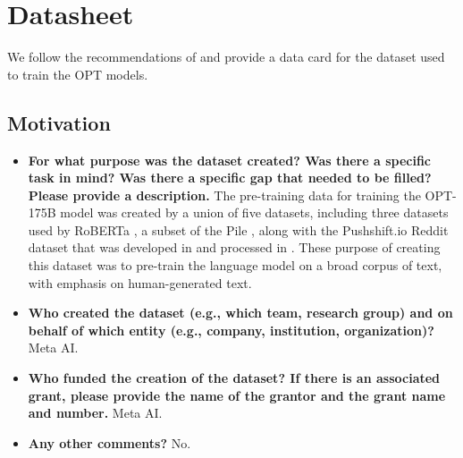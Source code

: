\documentclass[11pt]{article}
\begin{document}
 \section{Datasheet}
\label{sec:datasheet}
We follow the recommendations of \citet{gebru2021} and provide a data card for the dataset used to train the OPT models. 

\subsection{Motivation}
\begin{itemize}
    \item \textbf{For what purpose was the dataset created? Was there a specific task in mind? Was there a specific gap that needed to be filled? Please provide a description.} The pre-training data for training the OPT-175B model was created by a union of five datasets, including three datasets used by RoBERTa \cite{liu2019roberta}, a subset of the Pile \cite{thepile}, along with the Pushshift.io Reddit dataset that was developed in \cite{reddit2020} and processed in \cite{roller-etal-2021-recipes}. These purpose of creating this dataset was to pre-train the language model on a broad corpus of text, with emphasis on human-generated text.
    \item \textbf{Who created the dataset (e.g., which team, research group) and on behalf of which entity (e.g., company, institution, organization)?} Meta AI.
    \item \textbf{Who funded the creation of the dataset? If there is an associated grant, please provide the name of the grantor and the grant name and number.} Meta AI.
    \item \textbf{Any other comments?} No.
\end{itemize}
\end{document}
